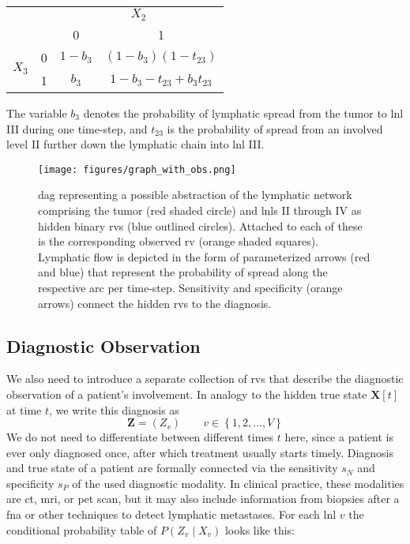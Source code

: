 \documentclass[twocolumn]{aastex631}
\begin{document}
\noindent
\begin{center}
    \begin{tabular}{|cc|cc|}
        \hline
        & & \multicolumn{2}{c|}{$X_2$} \\
        & & 0 & 1 \\
        \hline
        \multirow{2}{*}{$X_3$} & 0 & $1 - b_3$ & $(1 - b_3)(1 - t_{23})$ \\
        & 1 & $b_3$ & $1 - b_3 - t_{23} + b_3 t_{23}$ \\
        \hline
    \end{tabular}
\end{center}

The variable $b_3$ denotes the probability of lymphatic spread from the tumor to \gls{lnl} III during one time-step, and $t_{23}$ is the probability of spread from an involved level II further down the lymphatic chain into \gls{lnl} III. 

\begin{figure}
    \centering
    \texttt{[image: figures/graph\_with\_obs.png]}
    \caption{\Gls{dag} representing a possible abstraction of the lymphatic network comprising the tumor (red shaded circle) and \glspl{lnl} II through IV as hidden binary \glspl{rv} (blue outlined circles). Attached to each of these is the corresponding observed \gls{rv} (orange shaded squares). Lymphatic flow is depicted in the form of parameterized arrows (red and blue) that represent the probability of spread along the respective arc per time-step. Sensitivity and specificity (orange arrows) connect the hidden \glspl{rv} to the diagnosis.}
    \label{fig:graph_with_obs}
\end{figure}


\subsection{Diagnostic Observation}
\label{subsec:formalism:diagnosis}

We also need to introduce a separate collection of \glspl{rv} that describe the diagnostic observation of a patient's involvement. In analogy to the hidden true state $\mathbf{X}[t]$ at time $t$, we write this diagnosis as
%
\begin{equation}
    \mathbf{Z} = \left( Z_v \right) \qquad v \in \left\{ 1,2, \ldots, V \right\}
\end{equation}
%
We do not need to differentiate between different times $t$ here, since a patient is ever only diagnosed once, after which treatment usually starts timely.
Diagnosis and true state of a patient are formally connected via the sensitivity $s_N$ and specificity $s_P$ of the used diagnostic modality. In clinical practice, these modalities are \gls{ct}, \gls{mri}, or \gls{pet} scan, but it may also include information from biopsies after a \gls{fna} or other techniques to detect lymphatic metastases. For each \gls{lnl} $v$ the conditional probability table of $P\left( Z_v \mid X_v \right)$ looks like this:
\end{document}
